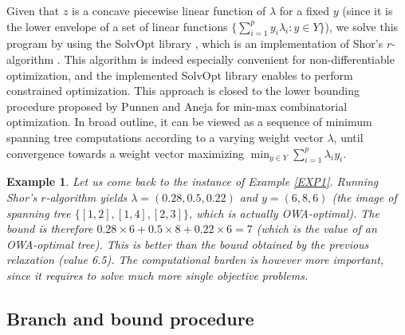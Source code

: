 \documentclass[final,3p,times]{elsarticle}
\newtheorem{example}{Example}
\begin{document}
Given that $z$ is a concave piecewise linear function of $\lambda$ for a fixed $y$ (since it is the
lower envelope of a set of linear functions $\{\sum_{i=1}^p y_i
\lambda_i : y \in Y\}$), we solve this program by using the SolvOpt
library \cite{KappK00}, which is an implementation of Shor's
$r$-algorithm \cite{Shor85}. This algorithm is indeed especially convenient for
non-differentiable optimization, and the implemented SolvOpt library
enables to perform constrained optimization. This approach is closed
to the lower bounding procedure proposed by Punnen and Aneja \cite{PunnA95} for min-max combinatorial optimization. In broad outline, it can be viewed as a sequence of minimum spanning tree computations according to a varying weight vector $\lambda$, until convergence towards a weight vector maximizing $\min_{y \in Y} \sum_{i=1}^p \lambda_i y_i$.

\begin{example}
Let us come back to the instance of Example \ref{EXP1}. Running Shor's $r$-algorithm yields $\lambda = (0.28,0.5,0.22)$ and $y = (6,8,6)$ (the image of spanning tree $\{[1,2],[1,4],[2,3]\}$, which is actually OWA-optimal). The bound is therefore $0.28 \times 6 + 0.5 \times 8 + 0.22 \times 6 = 7$ (which is the value of an OWA-optimal tree). This is better than the bound obtained by the previous relaxation (value 6.5). The computational burden is however more important, since it requires to solve much more single objective problems.
\end{example}

\subsection{Branch and bound procedure}
\end{document}
